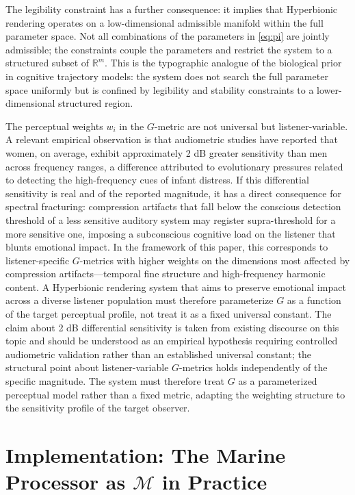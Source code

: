 \documentclass[12pt, a4paper]{article}
\begin{document}
The legibility constraint has a further consequence: it implies that Hyperbionic rendering operates on a low-dimensional admissible manifold within the full parameter space. Not all combinations of the parameters in \eqref{eq:pi} are jointly admissible; the constraints couple the parameters and restrict the system to a structured subset of $\mathbb{R}^m$. This is the typographic analogue of the biological prior in cognitive trajectory models: the system does not search the full parameter space uniformly but is confined by legibility and stability constraints to a lower-dimensional structured region.

The perceptual weights $w_i$ in the $G$-metric are not universal but listener-variable. A relevant empirical observation is that audiometric studies have reported that women, on average, exhibit approximately 2 dB greater sensitivity than men across frequency ranges, a difference attributed to evolutionary pressures related to detecting the high-frequency cues of infant distress. If this differential sensitivity is real and of the reported magnitude, it has a direct consequence for spectral fracturing: compression artifacts that fall below the conscious detection threshold of a less sensitive auditory system may register supra-threshold for a more sensitive one, imposing a subconscious cognitive load on the listener that blunts emotional impact. In the framework of this paper, this corresponds to listener-specific $G$-metrics with higher weights on the dimensions most affected by compression artifacts---temporal fine structure and high-frequency harmonic content. A Hyperbionic rendering system that aims to preserve emotional impact across a diverse listener population must therefore parameterize $G$ as a function of the target perceptual profile, not treat it as a fixed universal constant. The claim about 2 dB differential sensitivity is taken from existing discourse on this topic and should be understood as an empirical hypothesis requiring controlled audiometric validation rather than an established universal constant; the structural point about listener-variable $G$-metrics holds independently of the specific magnitude. The system must therefore treat $G$ as a parameterized perceptual model rather than a fixed metric, adapting the weighting structure to the sensitivity profile of the target observer.


\section{Implementation: The Marine Processor as $\mathcal{M}$ in Practice}
\end{document}
